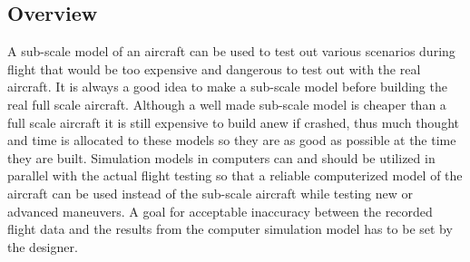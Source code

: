 \subsection{Overview}

A sub-scale model of an aircraft can be used to test out various scenarios during flight that would be too expensive and dangerous to test out with the real aircraft. It is always a good idea to make a sub-scale model before building the real full scale aircraft. Although a well made sub-scale model is cheaper than a full scale aircraft it is still expensive to build anew if crashed, thus much thought and time is allocated to these models so they are as good as possible at the time they are built. Simulation models in computers can and should be utilized in parallel with the actual flight testing so that a reliable computerized model of the aircraft can be used instead of the sub-scale aircraft while testing new or advanced maneuvers. A goal for acceptable inaccuracy between the recorded flight data and the results from the computer simulation model has to be set by the designer.
